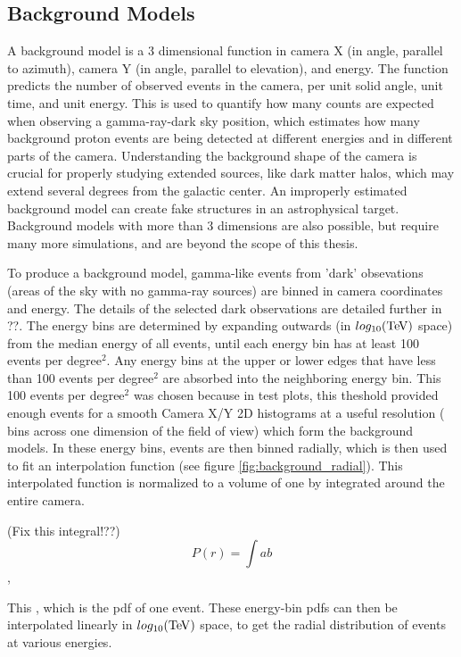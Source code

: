   \subsection{Background Models}\label{background_production}
    A background model is a 3 dimensional function in camera X (in angle, parallel to azimuth), camera Y (in angle, parallel to elevation), and energy.
    The function predicts the number of observed events in the camera, per unit solid angle, unit time, and unit energy.
    This is used to quantify how many counts are expected when observing a gamma-ray-dark sky position, which estimates how many background proton events are being detected at different energies and in different parts of the camera.
    Understanding the background shape of the camera is crucial for properly studying extended sources, like dark matter halos, which may extend several degrees from the galactic center.
    An improperly estimated background model can create fake structures in an astrophysical target.
    Background models with more than 3 dimensions are also possible, but require many more simulations, and are beyond the scope of this thesis.

    To produce a background model, gamma-like events from 'dark' obsevations (areas of the sky with no gamma-ray sources) are binned in camera coordinates and energy.
    The details of the selected dark observations are detailed further in ??.
    The energy bins are determined by expanding outwards (in $log_{10}(\TeV )$ space) from the median energy of all events, until each energy bin has at least 100 events per degree$^2$.
    Any energy bins at the upper or lower edges that have less than 100 events per degree$^2$ are absorbed into the neighboring energy bin.
    This 100 events per degree$^2$ was chosen because in test plots, this theshold provided enough events for a smooth Camera X/Y 2D histograms at a useful resolution ( bins across one dimension of the field of view) which form the background models.
    In these energy bins, events are then binned radially, which is then used to fit an interpolation function (see figure \ref{fig:background_radial}).
    This interpolated function is normalized to a volume of one by integrated around the entire camera.

    (Fix this integral!??)
    \begin{equation} \label{eqn:background_integral}
    P(r) = \int{a}{b}
    \end{equation},

    This , which is the pdf of one event.
    These energy-bin pdfs can then be interpolated linearly in $log_{10}(\TeV )$ space, to get the radial distribution of events at various energies.

